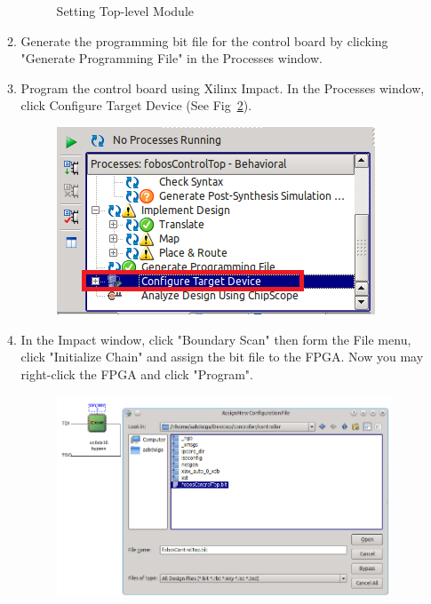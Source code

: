 \begin{enumerate}
\begin{enumerate}
\begin{figure}[H]
\begin{center}
		\caption{\label{fig:ctrl-set-top-level}Setting Top-level Module}
		\end{center} 
		\vspace{-1ex}
		\end{figure}
  \item Generate the programming bit file for the control board by clicking "Generate Programming File" in the Processes window.
  \item Program the control board using Xilinx Impact. In the Processes window, click Configure Target Device (See Fig~\ref{fig:ctrl-run-impact}).
		\begin{figure}[H]
		\begin{center}
		\includegraphics[scale=0.6]{figures/ctrl-run-impact}
		\caption{\label{fig:ctrl-run-impact}}
		\end{center}
		\vspace{-1ex}
		\end{figure}
  \item In the Impact window, click "Boundary Scan" then form the File menu, click "Initialize Chain" and assign the bit file to the FPGA. Now you may right-click the FPGA and click "Program".
		\begin{figure}[H]
		\begin{center}
		\includegraphics[scale=0.6]{figures/ctrl-program}

\end{center}
\end{figure}
\end{enumerate}
\end{enumerate}

